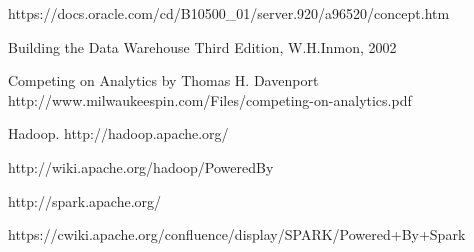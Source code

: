 \documentclass[10pt,journal,compsoc]{IEEEtran}
\begin{document}
\begin{thebibliography}{1}
https://docs.oracle.com/cd/B10500\_01/server.920/a96520/concept.htm

Building the Data Warehouse Third Edition, W.H.Inmon, 2002

Competing on Analytics by Thomas H. Davenport
http://www.milwaukeespin.com/Files/competing-on-analytics.pdf

Hadoop. http://hadoop.apache.org/

http://wiki.apache.org/hadoop/PoweredBy

http://spark.apache.org/

https://cwiki.apache.org/confluence/display/SPARK/Powered+By+Spark

\end{thebibliography}
\end{document}
